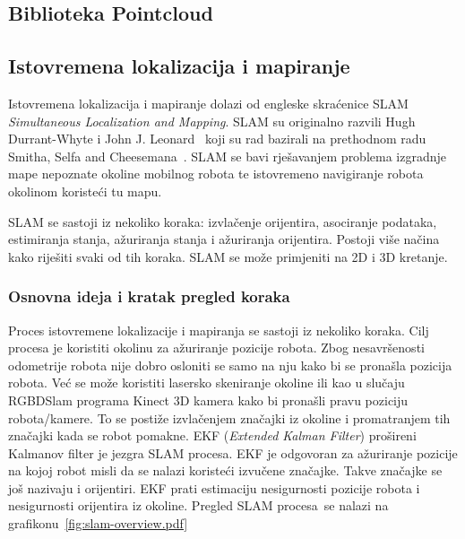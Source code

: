 
\subsection{Biblioteka Pointcloud} %
\label{sub:Biblioteka Pointcloud}



\newpage
\subsection{Istovremena lokalizacija i mapiranje} %
\label{sub:Slam}
Istovremena lokalizacija i mapiranje dolazi od engleske skraćenice
SLAM \textit{Simultaneous Localization and Mapping}. SLAM su
originalno razvili Hugh Durrant-Whyte i John J.
Leonard~\cite{Durrant:91b} koji su rad bazirali na prethodnom radu
Smitha, Selfa and Cheesemana~\cite{Smith86}. SLAM se bavi rješavanjem
problema izgradnje mape nepoznate okoline mobilnog robota te istovremeno
navigiranje robota okolinom koristeći tu mapu.

SLAM se sastoji iz nekoliko koraka: izvlačenje orijentira, asociranje
podataka, estimiranja stanja, ažuriranja stanja i ažuriranja orijentira.
Postoji više načina kako riješiti svaki od tih koraka. SLAM se može
primjeniti na 2D i 3D kretanje.

\subsubsection{Osnovna ideja i kratak pregled koraka} %
\label{ssub:Osnovna ideja }
Proces istovremene lokalizacije i mapiranja se sastoji iz nekoliko
koraka. Cilj procesa je koristiti okolinu za ažuriranje pozicije robota.
Zbog nesavršenosti odometrije robota nije dobro osloniti se samo na nju
kako bi se pronašla pozicija robota. Već se može koristiti lasersko
skeniranje okoline ili kao u slučaju RGBDSlam programa Kinect 3D kamera
kako bi pronašli pravu poziciju robota/kamere. To se postiže
izvlačenjem značajki iz okoline i promatranjem tih značajki kada se
robot pomakne. EKF (\textit{Extended Kalman Filter}) prošireni Kalmanov
filter je jezgra SLAM procesa. EKF je odgovoran za ažuriranje pozicije
na kojoj robot misli da se nalazi koristeći izvučene značajke. Takve
značajke se još nazivaju i orijentiri. EKF prati estimaciju nesigurnosti
pozicije robota i nesigurnosti orijentira iz okoline. Pregled SLAM
procesa~\footnotemark[1] se nalazi na grafikonu~\ref{fig:slam-overview.pdf}  

